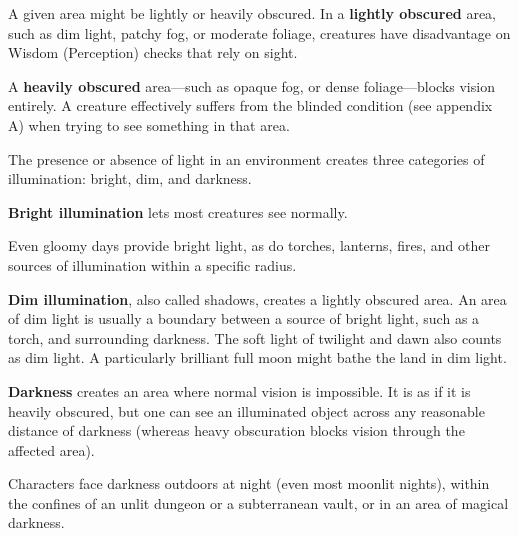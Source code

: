 A given area might be lightly or heavily obscured. In a \textbf{lightly obscured} area, such as dim light, patchy fog, or moderate foliage, creatures have disadvantage on Wisdom (Perception) checks that rely on sight.

A \textbf{heavily obscured} area—such as opaque fog, or dense foliage—blocks vision entirely. A creature effectively suffers from the blinded condition (see appendix A) when trying to see something in that area.

The presence or absence of light in an environment creates three categories of illumination: bright, dim, and darkness.

\textbf{Bright illumination} lets most creatures see normally.

Even gloomy days provide bright light, as do torches, lanterns, fires, and other sources of illumination within a specific radius.

\textbf{Dim illumination}, also called shadows, creates a lightly obscured area. An area of dim light is usually a boundary between a source of bright light, such as a torch, and surrounding darkness. The soft light of twilight and dawn also counts as dim light. A particularly brilliant full moon might bathe the land in dim light.

\textbf{Darkness} creates an area where normal vision is impossible. It is as if it is heavily obscured, but one can see an illuminated object across any reasonable distance of darkness (whereas heavy obscuration blocks vision through the affected area).

Characters face darkness outdoors at night (even most moonlit nights), within the confines of an unlit dungeon or a subterranean vault, or in an area of magical darkness.

